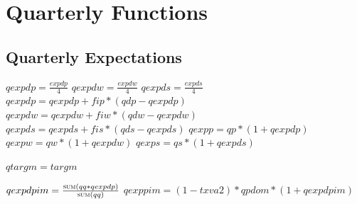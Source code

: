 \documentclass{article}
\begin{document}
\clearpage
\section{Quarterly Functions}

\subsection{Quarterly Expectations}

\begin{algorithm}[H]
\caption{Quarterly Exp}
    \begin{algorithmic}
        \State {}
        \State {}
        \EndFor
        \State {}
        \EndFor
        \State {}
        \EndFor
        \EndFunction
    \end{algorithmic}
\end{algorithm}

\begin{algorithm}[!htbp]
\caption{Quarterly Exp (Firm)}
    \begin{algorithmic}
        \State \(qexpdp=\frac{expdp}{4}\)
        \State \(qexpdw=\frac{expdw}{4}\)
        \State \(qexpds=\frac{expds}{4}\)
        \State \(qexpdp=qexpdp+fip*(qdp-qexpdp)\)
        \State \(qexpdw=qexpdw+fiw*(qdw-qexpdw)\)
        \State \(qexpds=qexpds+fis*(qds-qexpds)\)
        \EndIf
        \State \(qexpp = qp * (1 + qexpdp)\)
    	\State \(qexpw = qw * (1 + qexpdw)\)
    	\State \(qexps = qs * (1 + qexpds)\)
        \EndFunction
    \end{algorithmic}
\end{algorithm}

\begin{algorithm}[!htbp]
\caption{Quarterly Targ}
    \begin{algorithmic}
        \State \(qtargm = targm\)
        \EndFunction
    \end{algorithmic}
\end{algorithm}

\begin{algorithm}[!htbp]
\caption{Quarterly Exp (Market)}
    \begin{algorithmic}
        \State \(qexpdpim = \frac{\Call{sum}{qq * qexpdp}}{\Call{sum}{qq}}\)
        \State \(qexppim = (1 - txva2) * qpdom * (1 + qexpdpim)\)
        \EndFunction
    \end{algorithmic}
\end{algorithm}
\end{document}
